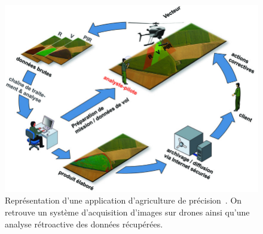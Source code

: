 \begin{figure}
  \begin{center}
    \includegraphics[scale=0.42]{./img/agridrone.jpeg}
  \end{center}
  \caption{Représentation d'une application d'agriculture de 
  précision~\cite{vegedrones}.
  On retrouve un système d'acquisition d'images sur drones ainsi
  qu'une analyse rétroactive des données récupérées.}
\end{figure}